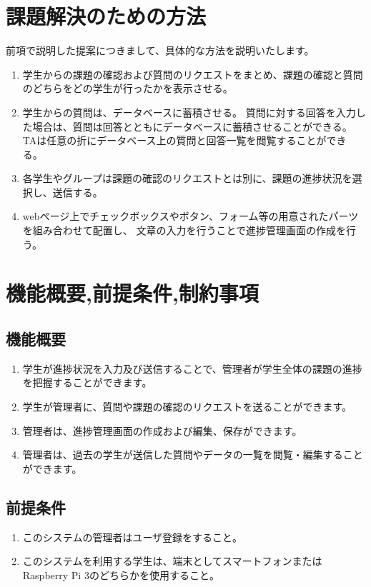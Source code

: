 \documentclass[a4j,titlepage]{ujarticle}
\begin{document}
\section{課題解決のための方法}
前項で説明した提案につきまして、具体的な方法を説明いたします。
\begin{enumerate}[(1)]
\item 学生からの課題の確認および質問のリクエストをまとめ、課題の確認と質問のどちらをどの学生が行ったかを表示させる。
\item 学生からの質問は、データベースに蓄積させる。
質問に対する回答を入力した場合は、質問は回答とともにデータベースに蓄積させることができる。
TAは任意の折にデータベース上の質問と回答一覧を閲覧することができる。
\item 各学生やグループは課題の確認のリクエストとは別に、課題の進捗状況を選択し、送信する。
\item webページ上でチェックボックスやボタン、フォーム等の用意されたパーツを組み合わせて配置し、
文章の入力を行うことで進捗管理画面の作成を行う。
\end{enumerate}

\section{機能概要,前提条件,制約事項}

\subsection{機能概要}
\begin{enumerate}[(1)]
\item 学生が進捗状況を入力及び送信することで、管理者が学生全体の課題の進捗を把握することができます。
\item 学生が管理者に、質問や課題の確認のリクエストを送ることができます。
\item 管理者は、進捗管理画面の作成および編集、保存ができます。
\item 管理者は、過去の学生が送信した質問やデータの一覧を閲覧・編集することができます。　
\end{enumerate}

\subsection{前提条件}
\begin{enumerate}[(1)]
\item このシステムの管理者はユーザ登録をすること。
\item このシステムを利用する学生は、端末としてスマートフォンまたはRaspberry Pi 3のどちらかを使用すること。
\end{enumerate}
\end{document}

